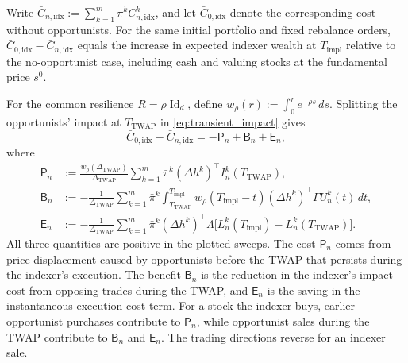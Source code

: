 \documentclass[12pt]{article}
\numberwithin{equation}{section}
\theoremstyle{definition}
\begin{document}
Write \(\bar C_{n,\mathrm{idx}}:=\sum_{k=1}^m\bar\pi^k
C_{n,\mathrm{idx}}^k\), and let \(\bar C_{0,\mathrm{idx}}\) denote the
corresponding cost without opportunists. For the same initial portfolio and
fixed rebalance orders, \(\bar C_{0,\mathrm{idx}}-\bar C_{n,\mathrm{idx}}\)
equals the increase in expected indexer wealth at \(T_{\mathrm{impl}}\)
relative to the no-opportunist case, including cash and valuing stocks at
the fundamental price \(s^0\).

For the common resilience \(R=\rho\operatorname{Id}_d\), define
\(w_\rho(r):=\int_0^r e^{-\rho s}\,ds\). Splitting the opportunists' impact
at \(T_{\mathrm{TWAP}}\) in \eqref{eq:transient_impact} gives
\begin{equation}\label{eq:experiments_savings_decomposition}
\bar C_{0,\mathrm{idx}}-\bar C_{n,\mathrm{idx}}
=-\mathsf P_n+\mathsf B_n+\mathsf E_n,
\end{equation}
where
\begin{align}
\mathsf P_n
&:=\frac{w_\rho(\Delta_{\mathrm{TWAP}})}{\Delta_{\mathrm{TWAP}}}
\sum_{k=1}^m\bar\pi^k(\Delta h^k)^\top I_n^k(T_{\mathrm{TWAP}}),
\label{eq:experiments_savings_pre_twap}\\
\mathsf B_n
&:=-\frac{1}{\Delta_{\mathrm{TWAP}}}
\sum_{k=1}^m\bar\pi^k
\int_{T_{\mathrm{TWAP}}}^{T_{\mathrm{impl}}}
w_\rho(T_{\mathrm{impl}}-t)(\Delta h^k)^\top\Gamma U_n^k(t)\,dt,
\label{eq:experiments_savings_during_twap}\\
\mathsf E_n
&:=-\frac{1}{\Delta_{\mathrm{TWAP}}}
\sum_{k=1}^m\bar\pi^k(\Delta h^k)^\top\Lambda
\bigl[L_n^k(T_{\mathrm{impl}})-L_n^k(T_{\mathrm{TWAP}})\bigr].
\label{eq:experiments_savings_execution}
\end{align}
All three quantities are positive in the plotted sweeps.
The cost \(\mathsf P_n\) comes from price displacement caused by opportunists
before the TWAP that persists during the indexer's execution.
The benefit \(\mathsf B_n\) is the reduction in the indexer's impact cost
from opposing trades during the TWAP, and \(\mathsf E_n\) is the saving in the
instantaneous execution-cost term. For a stock the indexer buys, earlier
opportunist purchases contribute to \(\mathsf P_n\), while opportunist sales
during the TWAP contribute to \(\mathsf B_n\) and \(\mathsf E_n\).
The trading directions reverse for an indexer sale.
\end{document}
